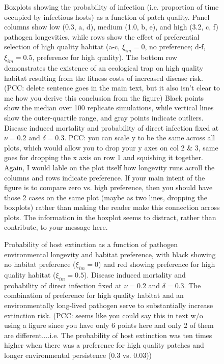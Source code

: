 \documentclass{article}
\begin{document}
\begin{figure}
\centering
\caption{Boxplots showing the probability of infection (i.e. proportion of time occupied by infectious hosts) as a function of patch quality.  Panel columns show low (0.3, a, d), medium (1.0, b, e), and high (3.2, c, f) pathogen longevities, while rows show the effect of preferential selection of high quality habitat (a-c, $\xi_{im} = 0$,  no preference; d-f, $\xi_{im} = 0.5$, preference for high quality). The bottom row demonstrates the existence of an ecological trap on high quality habitat resulting from the fitness costs of increased disease risk. (PCC: delete sentence goes in the main text, but it also isn't clear to me how you derive this conclusion from the figure) Black points show the median over 100 replicate simulations, while vertical lines show the outer-quartile range, and gray points indicate outliers. Disease induced mortality and probability of direct infection fixed at $\nu = 0.2$ and $\delta = 0.3$. PCC: you can scale y to be the same across all plots, which would allow you to drop your y axes on col 2 \& 3, same goes for dropping the x axis on row 1 and squishing it together. Again, I would lable on the plot itself how longevity runs acroll the columns and rows indicate preference. If your main intent of the figure is to compare zero vs. high preference, then you should have those 2 cases on the same plot (maybe as two lines, dropping the boxplots) rather than making the reader make this connection across plots. The information in the boxplot seems to distract, rather than contribute, to your message here. }
\label{pinfection}
\end{figure}

\begin{figure}
\centering
\caption{Probability of host extinction as a function of pathogen environmental longevity and habitat preference, with black showing no habitat preference ($\xi_{im} = 0$) and red showing preference for high quality habitat ($\xi_{im} = 0.5$).  Disease induced mortality and probability of direct infection fixed at $\nu = 0.2$ and $\delta = 0.3$.  The combination of preference for high quality habitat and an environmentally long-lived pathogen serve to substantially increase extinction risk.  (PCC: seems like you could say this in text w/o using a figure since you have only 6 points here and only 2 of them are different....i.e. The probability of host extinction was ten times higher when there was a preference for high quality patches and longer environmental persistence (0.3 vs. 0.03))}
\label{pext}
\end{figure}
\clearpage
\end{document}
